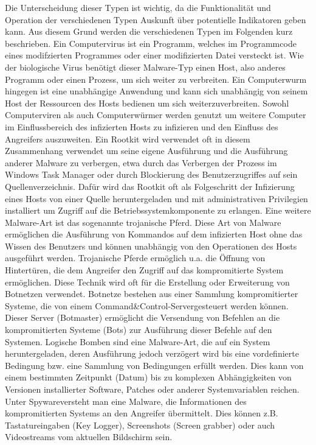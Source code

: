 Die Unterscheidung dieser Typen ist wichtig, da die Funktionalität und Operation der verschiedenen Typen Auskunft über potentielle Indikatoren geben kann. Aus diesem Grund werden die verschiedenen Typen im Folgenden kurz beschrieben. 
Ein Computervirus  ist ein Programm, welches im Programmcode eines modifzierten Programmes oder einer modifizierten Datei versteckt ist. Wie der biologische Virus benötigt dieser Malware-Typ einen Host, also anderes Programm oder einen Prozess, um sich weiter zu verbreiten. Ein Computerwurm hingegen ist eine unabhängige Anwendung und kann sich unabhängig von seinem Host der Ressourcen des Hosts bedienen um sich weiterzuverbreiten. Sowohl Computerviren als auch Computerwürmer werden genutzt um weitere Computer im Einflussbereich des infizierten Hosts zu infizieren und den Einfluss des Angreifers auszuweiten. 
Ein Rootkit wird verwendet oft in diesem Zusammenhang verwendet um seine eigene Ausführung und die Ausführung anderer Malware zu verbergen, etwa durch das Verbergen der Prozess im Windows Task Manager oder durch Blockierung des Benutzerzugriffes auf sein Quellenverzeichnis. Dafür wird das Rootkit oft als Folgeschritt der Infizierung eines Hosts von einer Quelle heruntergeladen und mit administrativen Privilegien installiert um Zugriff auf die Betriebssystemkomponente zu erlangen.
Eine weitere Malware-Art ist das sogenannte \glqq trojanische Pferd\grqq . Diese Art von Malware ermöglichen die Ausführung von Kommandos auf dem infizierten Host ohne das Wissen des Benutzers und können unabhängig von den Operationen des Hosts ausgeführt werden. Trojanische Pferde ermöglich u.a. die Öffnung von Hintertüren, die dem Angreifer den Zugriff auf das kompromitierte System ermöglichen. Diese Technik wird oft für die Erstellung oder Erweiterung von Botnetzen verwendet. Botnetze bestehen aus einer Sammlung kompromitierter Systeme, die von einem \glqq Command&Control-Server\grqq  gesteuert werden können. Dieser Server (Botmaster) ermöglicht die Versendung von Befehlen an die kompromitierten Systeme (Bots) zur Ausführung dieser Befehle auf den Systemen.
Logische Bomben sind eine Malware-Art, die auf ein System heruntergeladen, deren Ausführung jedoch verzögert wird bis eine vordefinierte Bedingung bzw. eine Sammlung von Bedingungen erfüllt werden. Dies kann von einem bestimmten Zeitpunkt (Datum) bis zu komplexen Abhängigkeiten von Versionen installierter Software, Patches oder anderer Systemvariablen reichen.
Unter \glqq Spyware\grqq  versteht man eine Malware, die Informationen des kompromitierten Systems an den Angreifer übermittelt. Dies können z.B. Tastatureingaben (Key Logger), Screenshots (Screen grabber) oder  auch Videostreams vom aktuellen Bildschirm sein.

